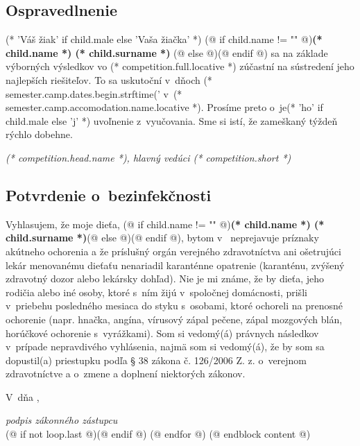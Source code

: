             \cutHere

            \subsection{Ospravedlnenie}
                (* 'Váš žiak' if child.male else 'Vaša žiačka' *)
                (@ if child.name != "" @)\textbf{(* child.name *) (* child.surname *)} (@ else @)\makebox[30mm]{\dotfill}(@ endif @)
                sa na základe výborných výsledkov vo (* competition.full.locative *)
                zúčastní na sústredení jeho najlepších riešiteľov. To sa uskutoční v~dňoch
                (* semester.camp.dates.begin.strftime('%
                v~(* semester.camp.accomodation.name.locative *). Prosíme preto o~je(* 'ho' if child.male else 'j' *) uvoľnenie z~vyučovania.
                Sme si istí, že zameškaný týždeň rýchlo dobehne.
                \vspace{5mm}

                \hfill \makebox[54mm]{\dotfill}

                \vspace*{-8pt}
                \hfill \textit{(* competition.head.name *), hlavný vedúci (* competition.short *)}

            \cutHere

            \subsection{Potvrdenie o~bezinfekčnosti}
                Vyhlasujem, že moje dieťa,
                (@ if child.name != "" @)\textbf{(* child.name *) (* child.surname *)}(@ else @)\makebox[30mm]{\dotfill}(@ endif @),
                bytom v~\makebox[30mm]{\dotfill} neprejavuje príznaky akútneho ochorenia a že
                príslušný orgán verejného zdravotníctva ani ošetrujúci lekár menovanému dieťaťu nenariadil
                karanténne opatrenie (karanténu, zvýšený zdravotný dozor alebo lekársky dohľad). Nie je mi známe, že
                by dieťa, jeho rodičia alebo iné osoby, ktoré s~ním žijú v~spoločnej domácnosti, prišli v~priebehu
                posledného mesiaca do styku s~osobami, ktoré ochoreli na prenosné ochorenie (napr. hnačka, angína,
                vírusový zápal pečene, zápal mozgových blán, horúčkové ochorenie s~vyrážkami). Som si
                vedomý(á) právnych následkov v~prípade nepravdivého vyhlásenia, najmä som si vedomý(á), že by som sa
                dopustil(a) priestupku podľa § 38 zákona č. 126/2006 Z. z. o~verejnom zdravotníctve a o~zmene a
                doplnení niektorých zákonov.
                \vspace{5mm}

                V~\dotfill dňa \dotfill, \hfill \makebox[46mm]{\dotfill}

                \vspace*{-8pt}
                \hfill \textit{podpis zákonného zástupcu} \\[5mm]

            (@ if not loop.last @)\newpage(@ endif @)
    (@ endfor @)
(@ endblock content @)
